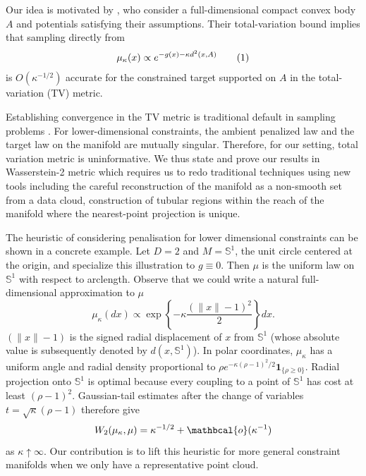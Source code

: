 \documentclass{article}
\numberwithin{equation}{section}
\newcommand{\Sbb}{\mathbb{S}}
\newcommand{\ocal}{\mathbcal{o}}
\newcommand\numberthis{\addtocounter{equation}{1}\tag{\theequation}}
\begin{document}
Our idea is motivated by \citet[Proposition~4]{brosse2017proximal}, who
consider a full-dimensional compact convex body $A$ and potentials satisfying
their assumptions. Their total-variation bound implies that sampling directly from
\[
\mu_\kappa(x) \propto e^{-g(x)-\kappa d^2(x,A)}  \numberthis\label{eq:brosse_idea}
\]
is $O(\kappa^{-1/2})$ accurate for the constrained target supported on $A$
in the total-variation (TV) metric.




Establishing convergence in the TV metric is traditional default in sampling problems \citep{dalalyan2020sampling, roberts1996geometric, roberts1996exponential, bhattacharya2025explicit, jones2004sufficient,pynadath2024gradient}. For lower-dimensional constraints, the ambient penalized law and the target law on the manifold are mutually singular. Therefore, for our setting, total variation metric is uninformative. We thus state and prove our results in Wasserstein-2 metric which requires us to redo traditional techniques using new tools including the careful reconstruction of the manifold as a non-smooth set from a data cloud, construction of tubular regions within the reach of the manifold where the nearest-point projection is unique.

The heuristic of considering penalisation for lower dimensional constraints can be shown in a concrete example. Let $D=2$
and $M=\mathbb S^1$, the unit circle centered at the origin, and specialize
this illustration to $g\equiv0$. Then $\mu$ is the uniform law on $\mathbb S^1$
with respect to arclength.
Observe that we could write a natural full-dimensional approximation to $\mu$
\[
\mu_\kappa(dx)
\propto
\exp\left\{
-\kappa \frac{(\|x\|-1)^2}{2}
\right\}dx.
\]
$(\|x\|-1)$ is the signed radial displacement of $x$ from $\Sbb^1$
(whose absolute value is subsequently denoted by $d(x,\Sbb^1)$). In polar
coordinates, $\mu_\kappa$ has a uniform angle and radial density proportional
to $\rho e^{-\kappa(\rho-1)^2/2}\mathbf 1_{\{\rho\ge0\}}$. Radial projection
onto $\mathbb S^1$ is optimal because every coupling to a point of
$\mathbb S^1$ has cost at least $(\rho-1)^2$. Gaussian-tail estimates after
the change of variables $t=\sqrt\kappa(\rho-1)$ therefore give
\[
W_2(\mu_\kappa,\mu)={\kappa^{-1/2}}+\ocal(\kappa^{-1})
\]
as \(\kappa\uparrow\infty\).  Our contribution is to lift this heuristic for more general constraint manifolds when we only have a representative point cloud.
\end{document}

